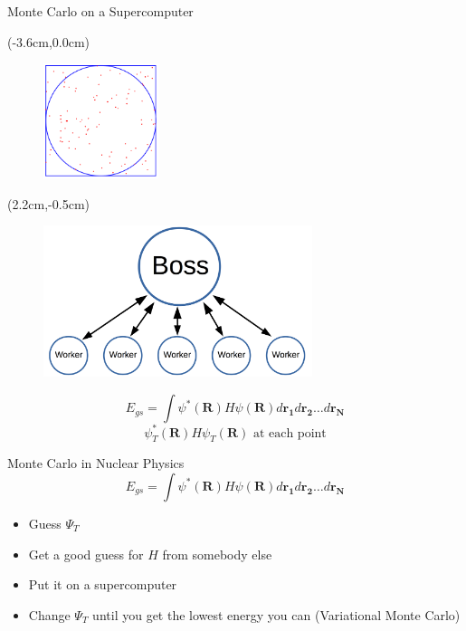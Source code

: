 \documentclass{beamer}
\begin{document}
\begin{frame}{Monte Carlo on a Supercomputer}
\begin{textblock*}{\textwidth}(-3.6cm,0.0cm) %
\begin{figure}[h]
   \includegraphics[width=0.3\textwidth]{figures/circle_square_points.pdf}
\end{figure}
\end{textblock*}
\begin{textblock*}{\textwidth}(2.2cm,-0.5cm) %
\begin{figure}[h]
   \includegraphics[width=0.7\textwidth]{figures/boss_worker.png}
\end{figure}
\end{textblock*}
\vspace{4.0cm}
\begin{equation*}
   E_{gs} = \int \psi^*(\mathbf{R})H\psi(\mathbf{R}) d\mathbf{r_1}d\mathbf{r_2}\ldots d\mathbf{r_N}
\end{equation*}
\begin{equation*}
   \psi_T^*(\mathbf{R}) H \psi_T(\mathbf{R}) \text{ at each point}
\end{equation*}
\end{frame}

\begin{frame}{Monte Carlo in Nuclear Physics}
\begin{equation*}
   E_{gs} = \int \psi^*(\mathbf{R})H\psi(\mathbf{R}) d\mathbf{r_1}d\mathbf{r_2}\ldots d\mathbf{r_N}
\end{equation*}
\begin{itemize}
   \item Guess $\Psi_T$
   \item Get a good guess for $H$ from somebody else
   \item Put it on a supercomputer
   \item Change $\Psi_T$ until you get the lowest energy you can (Variational Monte Carlo)
\end{itemize}
\end{frame}
\end{document}
